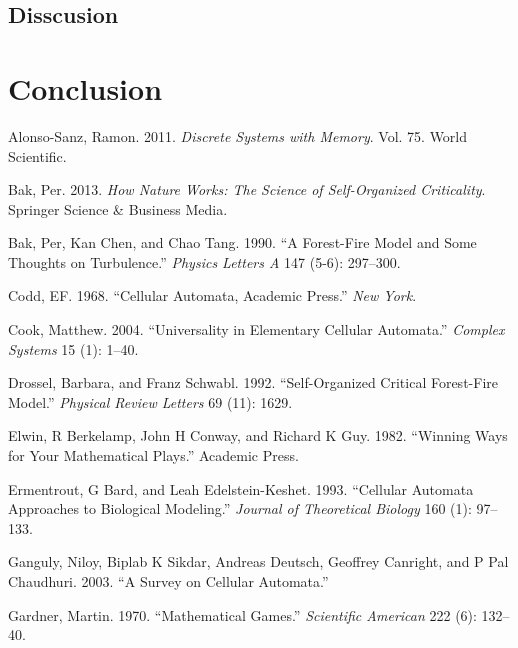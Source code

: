 \documentclass[
]{book}
\newlength{\cslhangindent}
\newenvironment{cslreferences}%
  {\setlength{\parindent}{0pt}%
  \everypar{\setlength{\hangindent}{\cslhangindent}}\ignorespaces}%
  {\par}
\begin{document}
\hypertarget{disscusion}{%
\section{Disscusion}\label{disscusion}}

\hypertarget{conclusion}{%
\chapter{Conclusion}\label{conclusion}}

\hypertarget{refs}{}
\begin{cslreferences}
\leavevmode\hypertarget{ref-alonso2011discrete}{}%
Alonso-Sanz, Ramon. 2011. \emph{Discrete Systems with Memory}. Vol. 75. World Scientific.

\leavevmode\hypertarget{ref-bak2013nature}{}%
Bak, Per. 2013. \emph{How Nature Works: The Science of Self-Organized Criticality}. Springer Science \& Business Media.

\leavevmode\hypertarget{ref-bak1990forest}{}%
Bak, Per, Kan Chen, and Chao Tang. 1990. ``A Forest-Fire Model and Some Thoughts on Turbulence.'' \emph{Physics Letters A} 147 (5-6): 297--300.

\leavevmode\hypertarget{ref-codd1968cellular}{}%
Codd, EF. 1968. ``Cellular Automata, Academic Press.'' \emph{New York}.

\leavevmode\hypertarget{ref-cook2004universality}{}%
Cook, Matthew. 2004. ``Universality in Elementary Cellular Automata.'' \emph{Complex Systems} 15 (1): 1--40.

\leavevmode\hypertarget{ref-drossel1992self}{}%
Drossel, Barbara, and Franz Schwabl. 1992. ``Self-Organized Critical Forest-Fire Model.'' \emph{Physical Review Letters} 69 (11): 1629.

\leavevmode\hypertarget{ref-elwin1982winning}{}%
Elwin, R Berkelamp, John H Conway, and Richard K Guy. 1982. ``Winning Ways for Your Mathematical Plays.'' Academic Press.

\leavevmode\hypertarget{ref-ermentrout1993cellular}{}%
Ermentrout, G Bard, and Leah Edelstein-Keshet. 1993. ``Cellular Automata Approaches to Biological Modeling.'' \emph{Journal of Theoretical Biology} 160 (1): 97--133.

\leavevmode\hypertarget{ref-ganguly2003survey}{}%
Ganguly, Niloy, Biplab K Sikdar, Andreas Deutsch, Geoffrey Canright, and P Pal Chaudhuri. 2003. ``A Survey on Cellular Automata.''

\leavevmode\hypertarget{ref-gardner1970mathematical}{}%
Gardner, Martin. 1970. ``Mathematical Games.'' \emph{Scientific American} 222 (6): 132--40.


\end{cslreferences}
\end{document}
